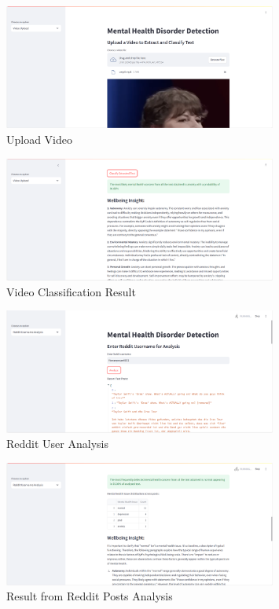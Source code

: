 \begin{figure}[h!]  
    \centering
    \includegraphics[width=0.8\textwidth]{App Images/12 Interface.png}  
    \caption{Upload Video}
    \label{06i4}  %
\end{figure}

\begin{figure}[h!]  
    \centering
    \includegraphics[width=0.8\textwidth]{App Images/13 Interface.png}  
    \caption{Video Classification Result}
    \label{06i}  %
\end{figure}

\pagebreak

\begin{figure}[h!]  
    \centering
    \includegraphics[width=0.8\textwidth]{App Images/06 Interface.png}  
    \caption{Reddit User Analysis}
    \label{07i}  %
\end{figure}

\begin{figure}[h!]  
    \centering
    \includegraphics[width=0.8\textwidth]{App Images/07 Interface.png}  
    \caption{Result from Reddit Posts Analysis}
    \label{08i}  %
\end{figure}


